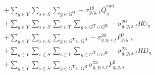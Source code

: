 \documentclass{article}
\newcommand{\sGeneratorsThermal}{G^{\mathrm{T}}}
\newcommand{\sGeneratorsHydro}{G^{\mathrm{H}}}
\newcommand{\sStorage}{G^{\mathrm{Q}}}
\newcommand{\sYears}{Y}
\newcommand{\sScenarios}{S}
\newcommand{\sIntervals}{T}
\newcommand{\sZones}{Z}
\newcommand{\iGenerator}{g}
\newcommand{\iYear}{y}
\newcommand{\iScenario}{s}
\newcommand{\iInterval}{t}
\newcommand{\iIntervalStart}{\underline{\iInterval}}
\newcommand{\iZone}{z}
\newcommand{\cRampRateUp}[1][\iGenerator]{RU_{#1}}
\newcommand{\cRampRateDown}[1][\iGenerator]{RD_{#1}}
\newcommand{\cStorageUnitEnergyIntervalEndMax}[1][\iGenerator]{\overline{Q}^{\mathrm{end}}_{#1}}
\newcommand{\cPowerInitial}[1][\iGenerator,\iYear,\iScenario]{P_{#1}^{0}}
\newcommand{\cPowerOutInitial}[1][\iGenerator,\iYear,\iScenario]{\hat{P}_{#1}^{\mathrm{out}}}
\newcommand{\cPowerInInitial}[1][\iGenerator,\iYear,\iScenario]{\hat{P}_{#1}^{\mathrm{in}}}
\newcommand{\vLostLoadPower}[1][\iZone,\iYear,\iScenario,\iInterval]{p^{\mathrm{V}}_{#1}}
\newcommand{\dMaxStorageEnergyIntervalEnd}[1][\iGenerator,\iYear,\iScenario]{\sigma_{#1}^{19}}
\newcommand{\dRampRateUp}[1][\iGenerator,\iYear,\iScenario,\iInterval]{\sigma_{#1}^{20}}
\newcommand{\dRampRateUpStorageCharging}[1][\iGenerator,\iYear,\iScenario,\iInterval]{\sigma_{#1}^{21}}
\newcommand{\dRampRateUpStorageDischarging}[1][\iGenerator,\iYear,\iScenario,\iInterval]{\sigma_{#1}^{22}}
\newcommand{\dRampRateDown}[1][\iGenerator,\iYear,\iScenario,\iInterval]{\sigma_{#1}^{23}}
\newcommand{\dRampRateDownStorageCharging}[1][\iGenerator,\iYear,\iScenario,\iInterval]{\sigma_{#1}^{24}}
\newcommand{\dNonNegativeLostLoad}[1][\iZone,\iYear,\iScenario,\iInterval]{\sigma_{#1}^{26}}
\begin{document}
\begin{align}
& + \sum\limits_{\iYear \in \sYears}\sum\limits_{\iScenario \in \sScenarios} \sum\limits_{\iGenerator \in \sStorage} - \dMaxStorageEnergyIntervalEnd \cStorageUnitEnergyIntervalEndMax\\
%
& + \sum\limits_{\iYear \in \sYears}\sum\limits_{\iScenario \in \sScenarios}\sum\limits_{\iInterval \in \sIntervals} \sum\limits_{\iGenerator \in \sGeneratorsThermal \cup \sGeneratorsHydro} - \dRampRateUp \cRampRateUp\\
& + \sum\limits_{\iYear \in \sYears}\sum\limits_{\iScenario \in \sScenarios} \sum\limits_{\iGenerator \in \sGeneratorsThermal \cup \sGeneratorsHydro} - \dRampRateUp[\iGenerator,\iYear,\iScenario,\iIntervalStart] \cPowerInitial\\
%
%
& + \sum\limits_{\iYear \in \sYears}\sum\limits_{\iScenario \in \sScenarios}\sum\limits_{\iInterval \in \sIntervals} \sum\limits_{\iGenerator \in \sGeneratorsThermal \cup \sGeneratorsHydro} - \dRampRateDown \cRampRateDown\\
& + \sum\limits_{\iYear \in \sYears}\sum\limits_{\iScenario \in \sScenarios} \sum\limits_{\iGenerator \in \sGeneratorsThermal \cup \sGeneratorsHydro} \dRampRateDown[\iGenerator,\iYear,\iScenario,\iIntervalStart] \cPowerInitial\\
%

\end{align}
\end{document}
